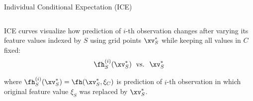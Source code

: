 \documentclass[11pt,compress,t,notes=noshow, aspectratio=169, xcolor=table]{beamer}
\begin{document}
\begin{frame}{Individual Conditional Expectation (ICE) }
\begin{columns}[T]
\begin{column}{0.84\textwidth}
\medskip

ICE curves visualize how prediction of $i$-th observation changes after varying its feature values indexed by $S$ using grid points $\xv_S^*$ while keeping all values in $C$ fixed:
$$\fh_{S}^{(i)}(\xv_S^*) \; \text{ vs. } \; \xv_S^*$$

where $\fh_{S}^{(i)}(\xv_S^*) = \fh(\xv_S^*, \xi_C)$ is prediction of $i$-th observation in which original feature value $\xi_S$ was replaced by $\xv_S^*$.


\end{column}
\end{columns}



%
\end{frame}
\end{document}
